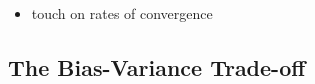\documentclass[reprint, english, nofootinbib]{revtex4-2}
\begin{document}
            \begin{itemize}
                \item touch on rates of convergence
            \end{itemize}

    \subsection{The Bias-Variance Trade-off}

        \noindent
\end{document}
